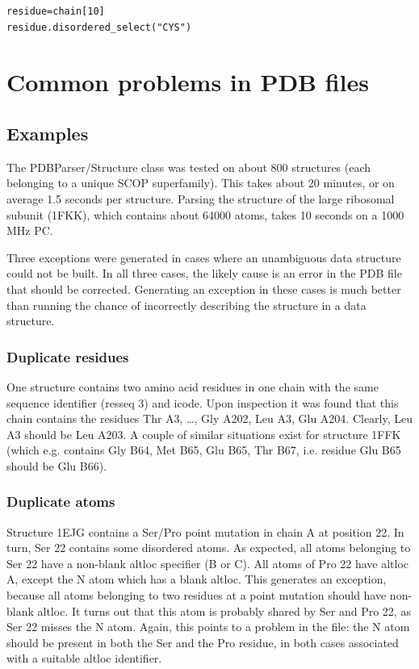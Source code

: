 \documentclass{report}
\begin{document}
\begin{verbatim}
residue=chain[10]
residue.disordered_select("CYS")
\end{verbatim}

\section{Common problems in PDB files}

\subsection{Examples\label{problem structures}}

The PDBParser/Structure class was tested on about 800 structures (each belonging
to a unique SCOP superfamily). This takes about 20 minutes, or on average 1.5
seconds per structure. Parsing the structure of the large ribosomal subunit
(1FKK), which contains about 64000 atoms, takes 10 seconds on a 1000 MHz PC.

Three exceptions were generated in cases where an unambiguous data structure
could not be built. In all three cases, the likely cause is an error in the
PDB file that should be corrected. Generating an exception in these cases
is much better than running the chance of incorrectly describing
the structure in a data structure.

\subsubsection{Duplicate residues}

One structure contains two amino acid residues in one chain with the same sequence
identifier (resseq 3) and icode. Upon inspection it was found that this chain
contains the residues Thr A3, \ldots{}, Gly A202, Leu A3, Glu A204. Clearly,
Leu A3 should be Leu A203. A couple of similar situations exist for structure
1FFK (which e.g. contains Gly B64, Met B65, Glu B65, Thr B67, i.e. residue Glu
B65 should be Glu B66).

\subsubsection{Duplicate atoms}

Structure 1EJG contains a Ser/Pro point mutation in chain A at position 22.
In turn, Ser 22 contains some disordered atoms. As expected, all atoms belonging
to Ser 22 have a non-blank altloc specifier (B or C). All atoms of Pro 22 have
altloc A, except the N atom which has a blank altloc. This generates an exception,
because all atoms belonging to two residues at a point mutation should have
non-blank altloc. It turns out that this atom is probably shared by Ser and
Pro 22, as Ser 22 misses the N atom. Again, this points to a problem in the
file: the N atom should be present in both the Ser and the Pro residue, in both
cases associated with a suitable altloc identifier.
\end{document}
